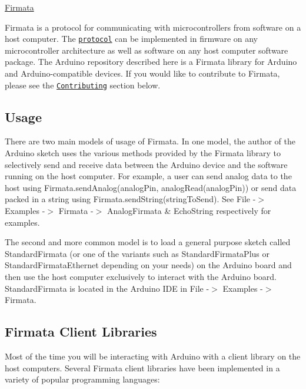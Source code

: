\hyperlink{_firmata_8h_a986c68fac4f21302213e609c277710d7}{Firmata}

\href{https://gitter.im/firmata/arduino?utm_source=badge&utm_medium=badge&utm_campaign=pr-badge&utm_content=badge}{\tt }

Firmata is a protocol for communicating with microcontrollers from software on a host computer. The \href{https://github.com/firmata/protocol}{\tt protocol} can be implemented in firmware on any microcontroller architecture as well as software on any host computer software package. The Arduino repository described here is a Firmata library for Arduino and Arduino-\/compatible devices. If you would like to contribute to Firmata, please see the \href{#contributing}{\tt Contributing} section below.

\subsection*{Usage}

There are two main models of usage of Firmata. In one model, the author of the Arduino sketch uses the various methods provided by the Firmata library to selectively send and receive data between the Arduino device and the software running on the host computer. For example, a user can send analog data to the host using {\ttfamily Firmata.\+send\+Analog(analog\+Pin, analog\+Read(analog\+Pin))} or send data packed in a string using {\ttfamily Firmata.\+send\+String(string\+To\+Send)}. See File -\/$>$ Examples -\/$>$ Firmata -\/$>$ Analog\+Firmata \& Echo\+String respectively for examples.

The second and more common model is to load a general purpose sketch called Standard\+Firmata (or one of the variants such as Standard\+Firmata\+Plus or Standard\+Firmata\+Ethernet depending on your needs) on the Arduino board and then use the host computer exclusively to interact with the Arduino board. Standard\+Firmata is located in the Arduino I\+DE in File -\/$>$ Examples -\/$>$ Firmata.

\subsection*{Firmata Client Libraries}

Most of the time you will be interacting with Arduino with a client library on the host computers. Several Firmata client libraries have been implemented in a variety of popular programming languages\+:


